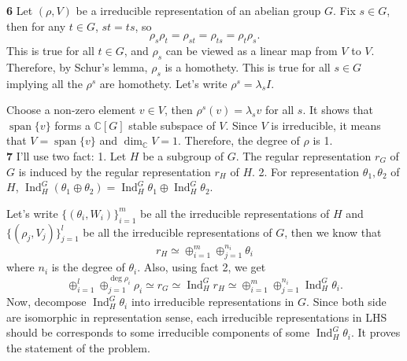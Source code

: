 \documentclass[a4paper, 12pt]{article}
\theoremstyle{Mydefinition}
\theoremstyle{Mytheorem}
\DeclareMathOperator{\spn}{span}
\DeclareMathOperator{\Ind}{Ind}
\begin{document}
\noindent \textbf{6}
Let $(\rho, V)$ be a irreducible representation of an abelian group $G$. Fix $s\in G$, then for any $t\in G$, $st = ts$, so
\begin{equation}
    \rho_s\rho_t = \rho_{st} = \rho_{ts} = \rho_t\rho_s.
\end{equation}
This is true for all $t\in G$, and $\rho_s$ can be viewed as a linear map from $V$ to $V$. Therefore, by Schur's lemma, $\rho_s$ is a homothety. This is true for all $s\in G$ implying all the $\rho^s$ are homothety. Let's write $\rho^s = \lambda_s I$. 

Choose a non-zero element $v\in V$, then $\rho^s(v) = \lambda_s v$ for all $s$. It shows that $\spn\{v\}$ forms a $\mathbb{C}[G]$ stable subspace of $V$. Since $V$ is irreducible, it means that $V=\spn\{v\}$ and $\dim_\mathbb{C} V = 1$. Therefore, the degree of $\rho$ is 1.\\

\noindent \textbf{7}
I'll use two fact: 1. Let $H$ be a subgroup of $G$. The regular representation $r_G$ of $G$ is induced by the regular representation $r_H$ of $H$. 2. For representation $\theta_1,\theta_2$ of $H$, $\Ind_H^G \left(\theta_1\oplus \theta_2\right) = \Ind_H^G \theta_1\oplus \Ind_H^G \theta_2$.

Let's write $\{(\theta_i, W_i)\}_{i=1}^m$ be all the irreducible representations of $H$ and $\{(\rho_j, V_j)\}_{j=1}^l$ be all the irreducible representations of $G$, then we know that
\begin{equation}
    r_H\simeq \oplus_{i=1}^m \oplus_{j=1}^{n_i}\theta_i
\end{equation}
where $n_i$ is the degree of $\theta_i$. Also, using fact 2, we get
\begin{equation}
    \oplus_{i=1}^l \oplus_{j=1}^{\deg\rho_i}\rho_i\simeq r_G\simeq \Ind_H^G r_H \simeq \oplus_{i=1}^m \oplus_{j=1}^{n_i}\Ind_H^G \theta_i.
\end{equation}
Now, decompose $\Ind_H^G \theta_i$ into irreducible representations in $G$. Since both side are isomorphic in representation sense, each irreducible representations in LHS should be corresponds to some irreducible components of some $\Ind_H^G \theta_i$. It proves the statement of the problem.
\end{document}
